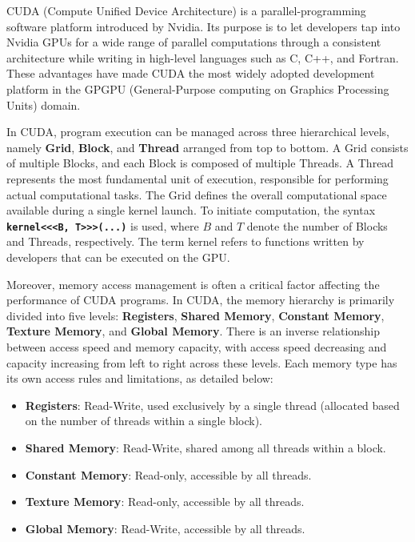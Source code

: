 \documentclass[PhD]{PHlab-thesis}
\begin{document}
CUDA (Compute Unified Device Architecture) is a parallel-programming software platform introduced by Nvidia\cite{CUDA1, CUDA2}. Its purpose is to let developers tap into Nvidia GPUs for a wide range of parallel computations through a consistent architecture while writing in high-level languages such as C, C++, and Fortran. These advantages have made CUDA the most widely adopted development platform in the GPGPU (General-Purpose computing on Graphics Processing Units) domain.

In CUDA, program execution can be managed across three hierarchical levels, namely \textbf{Grid}, \textbf{Block}, and \textbf{Thread} arranged from top to bottom. A Grid consists of multiple Blocks, and each Block is composed of multiple Threads. A Thread represents the most fundamental unit of execution, responsible for performing actual computational tasks. The Grid defines the overall computational space available during a single kernel launch. To initiate computation, the syntax \texttt{\textbf{kernel<<<B, T>>>(...)}} is used, where $B$ and $T$ denote the number of Blocks and Threads, respectively. The term kernel refers to functions written by developers that can be executed on the GPU.

Moreover, memory access management is often a critical factor affecting the performance of CUDA programs. In CUDA, the memory hierarchy is primarily divided into five levels: \textbf{Registers}, \textbf{Shared Memory}, \textbf{Constant Memory}, \textbf{Texture Memory}, and \textbf{Global Memory}. There is an inverse relationship between access speed and memory capacity, with access speed decreasing and capacity increasing from left to right across these levels. Each memory type has its own access rules and limitations, as detailed below:

\begin{itemize}
  \item \textbf{Registers}: Read-Write, used exclusively by a single thread (allocated based on the number of threads within a single block).
  \item \textbf{Shared Memory}: Read-Write, shared among all threads within a block.
  \item \textbf{Constant Memory}: Read-only, accessible by all threads.
  \item \textbf{Texture Memory}: Read-only, accessible by all threads.
  \item \textbf{Global Memory}: Read-Write, accessible by all threads.
\end{itemize}
\end{document}

